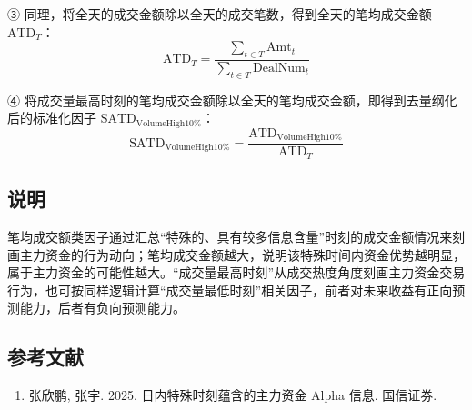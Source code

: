 \documentclass{article}
\begin{document}
③ 同理，将全天的成交金额除以全天的成交笔数，得到全天的笔均成交金额 \( \mathrm{ATD}_T \)：
\begin{equation}
    \mathrm{ATD}_T = \frac{\sum_{t \in T} \mathrm{Amt}_t}{\sum_{t \in T} \mathrm{DealNum}_t}
\end{equation}

④ 将成交量最高时刻的笔均成交金额除以全天的笔均成交金额，即得到去量纲化后的标准化因子 \( \mathrm{SATD}_{\mathrm{VolumeHigh10\%}} \)：
\begin{equation}
    \mathrm{SATD}_{\mathrm{VolumeHigh10\%}} = \frac{\mathrm{ATD}_{\mathrm{VolumeHigh10\%}}}{\mathrm{ATD}_T}
\end{equation}

\subsection{说明}
笔均成交额类因子通过汇总“特殊的、具有较多信息含量”时刻的成交金额情况来刻画主力资金的行为动向；笔均成交金额越大，说明该特殊时间内资金优势越明显，属于主力资金的可能性越大。“成交量最高时刻”从成交热度角度刻画主力资金交易行为，也可按同样逻辑计算“成交量最低时刻”相关因子，前者对未来收益有正向预测能力，后者有负向预测能力。

\subsection{参考文献}
\begin{enumerate}
    \item 张欣鹏, 张宇. 2025. 日内特殊时刻蕴含的主力资金 Alpha 信息. 国信证券.
\end{enumerate}
\end{document}
